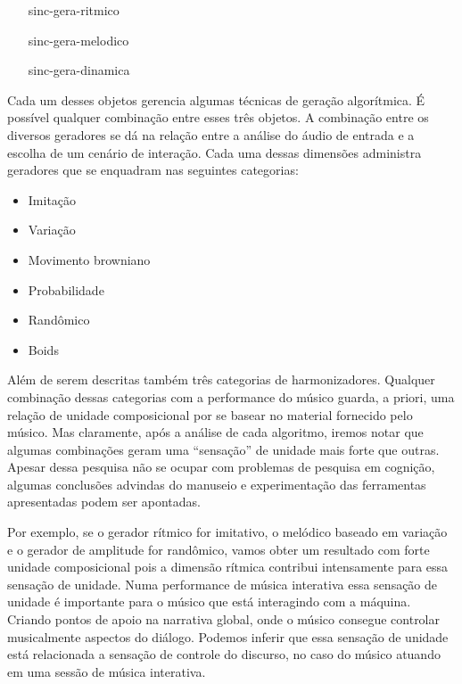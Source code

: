 \documentclass{ppgmus}
\begin{document}
\begin{itemize}
 \item   [sinc-gera-ritmico]
 \item   [sinc-gera-melodico]
 \item   [sinc-gera-dinamica]
\end{itemize}

Cada um desses objetos gerencia algumas técnicas de geração
algorítmica. É possível qualquer combinação entre esses três objetos.
A combinação entre os diversos geradores se dá na relação entre a 
análise do áudio de entrada e a escolha de um cenário de interação. 
Cada uma dessas dimensões administra geradores que se enquadram nas seguintes
categorias:

\begin{itemize}
 \item   Imitação
 \item   Variação
 \item   Movimento browniano
 \item   Probabilidade
 \item   Randômico
 \item   Boids
\end{itemize}

Além de serem descritas também três categorias de harmonizadores.
Qualquer combinação dessas categorias com a performance do músico guarda, a priori,  
uma relação de unidade composicional por se basear no material fornecido pelo músico.
Mas claramente, após a análise de cada algoritmo, iremos notar que algumas combinações 
geram uma ``sensação'' de unidade mais forte que outras. Apesar dessa pesquisa
não se ocupar com problemas de pesquisa em cognição, algumas conclusões advindas
do manuseio e experimentação das ferramentas apresentadas podem ser apontadas.

Por exemplo, se o gerador rítmico for imitativo, o melódico baseado em
variação e o gerador de amplitude for randômico, vamos obter um resultado
com forte unidade composicional pois a dimensão rítmica contribui intensamente
para essa sensação de unidade. Numa performance de música interativa essa sensação
de unidade é importante para o músico que está interagindo com a máquina. Criando
pontos de apoio na narrativa global, onde o músico consegue controlar musicalmente 
aspectos do diálogo. Podemos inferir que essa sensação de unidade está relacionada
a sensação de controle do discurso, no caso do músico atuando em uma sessão de música
interativa.

% 
% 
\end{document}
